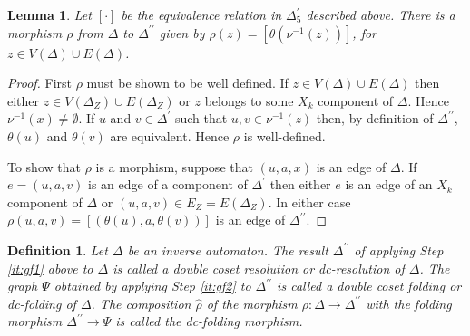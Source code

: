 \documentclass[a4paper,12pt]{article}
\newcommand{\D}{\Delta }
\renewcommand{\S}{\Sigma }
\newcommand{\nul}{\emptyset }
\newtheorem{lemma}[theorem]{Lemma}
\newtheorem{definition}[theorem]{Definition}
\numberwithin{equation}{section}
\numberwithin{figure}{section}
\newcommand{\maps}{\rightarrow}
\begin{document}
\begin{lemma}\label{lem:resol-quot}
Let $[\cdot]$ be the equivalence relation in $\D^\prime_5$
described above. There is a morphism $\rho$ from  $\D$ to
$\D^{\prime\prime}$ given by $\rho(z)=[\theta(\nu^{-1}(z))]$, for
$z\in V(\D)\cup E(\D)$.
\end{lemma}
\begin{proof}
First $\rho$ must be shown to be well defined. If $z \in V(\D)\cup
E(\D)$ then either $z\in V(\D_Z)\cup E(\D_Z)$ or $z$ belongs to
some $X_k$ component of $\D$. Hence
 $\nu^{-1}(x)\neq \nul$. If $u$ and $v\in \D^\prime$ such that $u, v \in \nu^{-1}(z)$ then, by definition of
$\D^{\prime\prime}$, $\theta(u)$ and $\theta(v)$ are equivalent.
Hence $\rho$ is well-defined.

To show that $\rho$ is a morphism, suppose that $(u,a,x)$ is an edge
of $\D$. If $e=(u,a,v)$ is an edge of a component of $\D^\prime$ then
either $e$ is an edge of an $X_k$ component of $\D$ or
 $(u,a,v)\in E_Z=E(\D_Z)$. In either  case
$\rho(u,a,v)=[(\theta(u),a,\theta(v))]$ is an edge of $\D^{\prime\prime}$.
\end{proof}

\begin{definition}
Let $\D$ be an inverse automaton.
 The result $\D^{\prime\prime}$ of applying Step \ref{it:gf1}
above to $\D$ is called a \emph{double coset resolution} or
\emph{dc-resolution} of $\D$. The graph $\Psi$ obtained by applying
Step \ref{it:gf2} to $\D^{\prime\prime}$ is called a \emph{double
coset folding} or \emph{dc-folding} of $\D$.  The composition $\hat\rho$ of
the  morphism
$\rho:\D\maps \D^{\prime\prime}$ with the folding morphism $\D^{\prime\prime}\maps
\Psi$ is called the \emph{dc-folding morphism}.
\end{definition}
\end{document}
